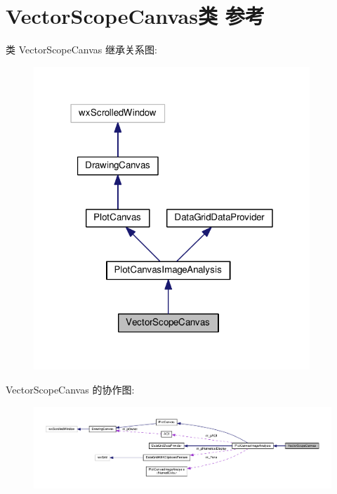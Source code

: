 \hypertarget{class_vector_scope_canvas}{\section{Vector\+Scope\+Canvas类 参考}
\label{class_vector_scope_canvas}
}


类 Vector\+Scope\+Canvas 继承关系图\+:
\nopagebreak
\begin{figure}[H]
\begin{center}
\leavevmode
\includegraphics[width=295pt]{class_vector_scope_canvas__inherit__graph}
\end{center}
\end{figure}


Vector\+Scope\+Canvas 的协作图\+:
\nopagebreak
\begin{figure}[H]
\begin{center}
\leavevmode
\includegraphics[width=350pt]{class_vector_scope_canvas__coll__graph}
\end{center}
\end{figure}
